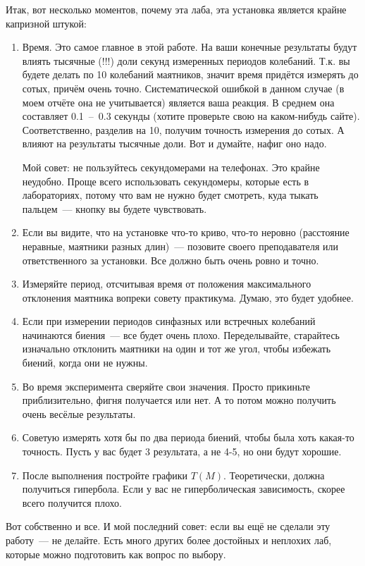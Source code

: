\documentclass[a4paper,12pt]{article}
\theoremstyle{plain} %
\theoremstyle{definition} %
\theoremstyle{remark} %
\begin{document}
Итак, вот несколько моментов, почему эта лаба, эта установка является крайне капризной штукой:
\begin{enumerate}
	\item Время. Это самое главное в этой работе. На ваши конечные результаты будут влиять тысячные (!!!) доли секунд измеренных периодов колебаний. Т.к. вы будете делать по 10 колебаний маятников, значит время придётся измерять до сотых, причём очень точно. Систематической ошибкой в данном случае (в моем отчёте она не учитывается) является ваша реакция. В среднем она составляет 0.1~--~0.3 секунды (хотите проверьте свою на каком-нибудь сайте). Соответственно, разделив на 10, получим точность измерения до сотых. А влияют на результаты тысячные доли. Вот и думайте, нафиг оно надо.
	
	Мой совет: не пользуйтесь секундомерами на телефонах. Это крайне неудобно. Проще всего использовать секундомеры, которые есть в лабораториях, потому что вам не нужно будет смотреть, куда тыкать пальцем~--- кнопку вы будете чувствовать.
	\item Если вы видите, что на установке что-то криво, что-то неровно (расстояние неравные, маятники разных длин)~--- позовите своего преподавателя или ответственного за установки. Все должно быть очень ровно и точно.
	\item Измеряйте период, отсчитывая время от положения максимального отклонения маятника вопреки совету практикума. Думаю, это будет удобнее.
	\item Если при измерении периодов синфазных или встречных колебаний начинаются биения~--- все будет очень плохо. Переделывайте, старайтесь изначально отклонить маятники на один и тот же угол, чтобы избежать биений, когда они не нужны.
	\item Во время эксперимента сверяйте свои значения. Просто прикиньте приблизительно, фигня получается или нет. А то потом можно получить очень весёлые результаты.
	\item Советую измерять хотя бы по два периода биений, чтобы была хоть какая-то точность. Пусть у вас будет 3 результата, а не 4-5, но они будут хорошие.
	\item После выполнения постройте графики $T(M)$. Теоретически, должна получиться гипербола. Если у вас не гиперболическая зависимость, скорее всего получится плохо.
\end{enumerate}
Вот собственно и все. И мой последний совет: если вы ещё не сделали эту работу~--- не делайте. Есть много других более достойных и неплохих лаб, которые можно подготовить как вопрос по выбору.
\end{document}
